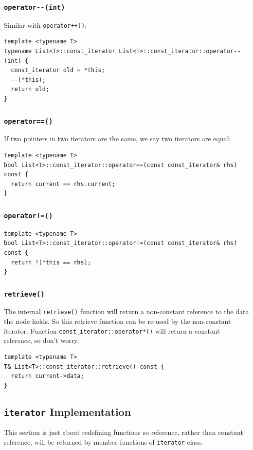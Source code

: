 \documentclass[12pt]{book}
\begin{document}
\subsubsection{\texttt{operator-{}-(int)}}
\label{sec:orgce735b5}
Similar with \texttt{operator++()}:
\begin{verbatim}
template <typename T>
typename List<T>::const_iterator List<T>::const_iterator::operator--(int) {
  const_iterator old = *this;
  --(*this);
  return old;
}
\end{verbatim}
\subsubsection{\texttt{operator==()}}
\label{sec:org6c7d37d}
If two pointers in two iterators are the same, we say two iterators are equal:
\begin{verbatim}
template <typename T>
bool List<T>::const_iterator::operator==(const const_iterator& rhs) const {
  return current == rhs.current;
}
\end{verbatim}
\subsubsection{\texttt{operator!=()}}
\label{sec:org920c83f}
\begin{verbatim}
template <typename T>
bool List<T>::const_iterator::operator!=(const const_iterator& rhs) const {
  return !(*this == rhs);
}
\end{verbatim}
\subsubsection{\texttt{retrieve()}}
\label{sec:orgae2e42d}
The internal \texttt{retrieve()} function will return a non-constant reference to the data the node holds. So this retrieve function can be re-used by the non-constant iterator. Function \texttt{const\_iterator::operator*()} will return a constant reference, so don't worry.
\begin{verbatim}
template <typename T>
T& List<T>::const_iterator::retrieve() const {
  return current->data;
}
\end{verbatim}
\subsection{\texttt{iterator} Implementation}
\label{sec:org6f8303c}
This section is just about redefining functions so reference, rather than constant reference, will be returned by member functions of \texttt{iterator} class.
\end{document}

